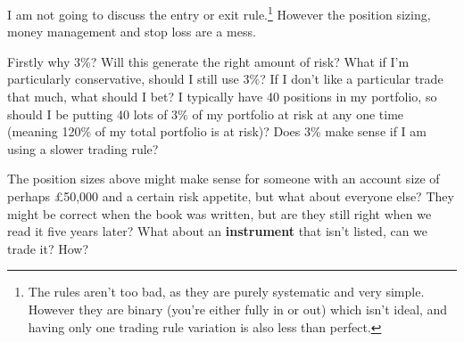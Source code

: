 
I am not going to discuss the entry or exit rule.\footnote{The rules aren't too bad, as they are purely systematic and very simple. However they are binary (you're either fully in or out) which isn't ideal, and having only one trading rule variation is also less than perfect.} However the position sizing, money management and stop loss are a mess. 

Firstly why 3\%? Will this generate the right amount of risk? What if I'm particularly conservative, should I still use 3\%? If I don't like a particular trade that much, what should I bet? I typically have 40 positions in my portfolio, so should I be putting 40 lots of 3\% of my portfolio at risk at any one time (meaning 120\% of my total portfolio is at risk)? Does 3\% make sense if I am using a slower trading rule? 

The position sizes above might make sense for someone with an account size of perhaps £50,000 and a certain risk appetite, but what about everyone else? They might be correct when the book was written, but are they still right when we read it five years later? What about an \textbf{instrument} that isn't listed, can we trade it? How? 

